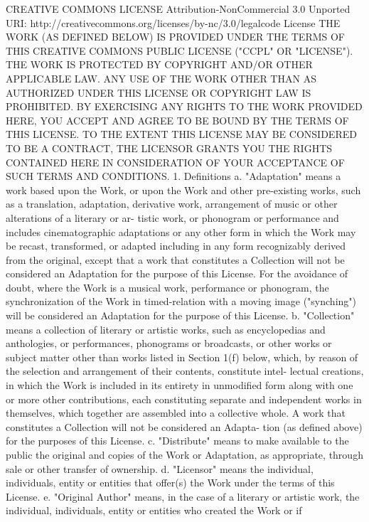 \documentclass[oneside]{book}
\begin{document}
CREATIVE COMMONS LICENSE Attribution-NonCommercial 3.0 Unported URI:
http://creativecommons.org/licenses/by-nc/3.0/legalcode License THE WORK (AS
DEFINED BELOW) IS PROVIDED UNDER THE TERMS OF THIS CREATIVE COMMONS PUBLIC
LICENSE ("CCPL" OR "LICENSE"). THE WORK IS PROTECTED BY COPYRIGHT AND/OR OTHER
APPLICABLE LAW. ANY USE OF THE WORK OTHER THAN AS AUTHORIZED UNDER THIS LICENSE
OR COPYRIGHT LAW IS PROHIBITED.  BY EXERCISING ANY RIGHTS TO THE WORK PROVIDED
HERE, YOU ACCEPT AND AGREE TO BE BOUND BY THE TERMS OF THIS LICENSE. TO THE
EXTENT THIS LICENSE MAY BE CONSIDERED TO BE A CONTRACT, THE LICENSOR GRANTS YOU
THE RIGHTS CONTAINED HERE IN CONSIDERATION OF YOUR ACCEPTANCE OF SUCH TERMS AND
CONDITIONS.  1. Definitions a. "Adaptation" means a work based upon the Work, or
upon the Work and other pre-existing works, such as a translation, adaptation,
derivative work, arrangement of music or other alterations of a literary or ar-
tistic work, or phonogram or performance and includes cinematographic
adaptations or any other form in which the Work may be recast, transformed, or
adapted including in any form recognizably derived from the original, except
that a work that constitutes a Collection will not be considered an Adaptation
for the purpose of this License. For the avoidance of doubt, where the Work is a
musical work, performance or phonogram, the synchronization of the Work in
timed-relation with a moving image ("synching") will be considered an Adaptation
for the purpose of this License.  b. "Collection" means a collection of literary
or artistic works, such as encyclopedias and anthologies, or performances,
phonograms or broadcasts, or other works or subject matter other than works
listed in Section 1(f) below, which, by reason of the selection and arrangement
of their contents, constitute intel- lectual creations, in which the Work is
included in its entirety in unmodified form along with one or more other
contributions, each constituting separate and independent works in themselves,
which together are assembled into a collective whole. A work that constitutes a
Collection will not be considered an Adapta- tion (as defined above) for the
purposes of this License.  c. "Distribute" means to make available to the public
the original and copies of the Work or Adaptation, as appropriate, through sale
or other transfer of ownership.  d. "Licensor" means the individual,
individuals, entity or entities that offer(s) the Work under the terms of this
License.  e. "Original Author" means, in the case of a literary or artistic
work, the individual, individuals, entity or entities who created the Work or if
\end{document}
